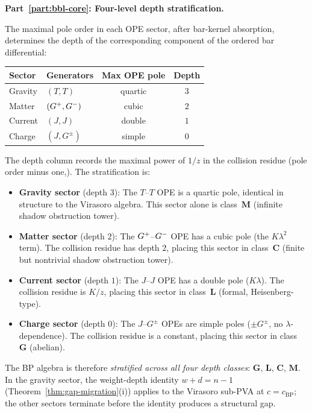 \begin{computation}[The ordered bar complex of the
Bershadsky--Polyakov algebra
$\mathcal{B}^{k'} = W_{k'}(\mathfrak{sl}_3,f_{\min})$;
\ClaimStatusProvedHere]
\medskip
\noindent\textbf{Part~\ref{part:bbl-core}: Four-level depth stratification.}

\begin{remark}
\label{rem:bp-depth-stratification}
The maximal pole order in each OPE sector, after bar-kernel
absorption, determines the depth of the corresponding
component of the ordered bar differential:
\begin{center}
\renewcommand{\arraystretch}{1.15}
\begin{tabular}{llcc}
\textbf{Sector} & \textbf{Generators}
& \textbf{Max OPE pole} & \textbf{Depth} \\
\hline
Gravity & $(T,T)$ & quartic & $3$ \\
Matter & $(G^+,G^-)$ & cubic & $2$ \\
Current & $(J,J)$ & double & $1$ \\
Charge & $(J,G^\pm)$ & simple & $0$
\end{tabular}
\end{center}
The depth column records the maximal power of $1/z$ in the
collision residue (pole order minus one,). The
stratification is:
\begin{itemize}
\item \textbf{Gravity sector} (depth $3$): The $T$--$T$ OPE
is a quartic pole, identical in structure to the Virasoro
algebra. This sector alone is class~$\mathbf{M}$
(infinite shadow obstruction tower).
\item \textbf{Matter sector} (depth $2$): The $G^+$--$G^-$
OPE has a cubic pole (the $K\lambda^2$ term). The collision
residue has depth $2$, placing this sector in
class~$\mathbf{C}$ (finite but nontrivial shadow obstruction tower).
\item \textbf{Current sector} (depth $1$): The $J$--$J$ OPE
has a double pole ($K\lambda$). The collision residue is
$K/z$, placing this sector in class~$\mathbf{L}$
(formal, Heisenberg-type).
\item \textbf{Charge sector} (depth $0$): The $J$--$G^\pm$
OPEs are simple poles ($\pm G^\pm$, no $\lambda$-dependence).
The collision residue is a constant, placing this sector in
class~$\mathbf{G}$ (abelian).
\end{itemize}
The BP algebra is therefore \emph{stratified across all four
depth classes}: $\mathbf{G}$, $\mathbf{L}$, $\mathbf{C}$,
$\mathbf{M}$. In the gravity sector, the weight-depth identity $w + d = n - 1$ (Theorem~\ref{thm:gap-migration}(i)) applies to the Virasoro sub-PVA at $c = c_{\mathrm{BP}}$; the other sectors terminate before the identity produces a structural gap.

\end{remark}
\end{computation}
